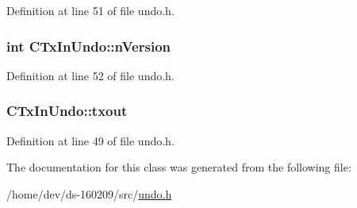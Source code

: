 Definition at line 51 of file undo.\+h.

\hypertarget{class_c_tx_in_undo_a193281289475ca792e436a7a02de23ef}{}
\subsubsection[{n\+Version}]{\setlength{\rightskip}{0pt plus 5cm}int C\+Tx\+In\+Undo\+::n\+Version}\label{class_c_tx_in_undo_a193281289475ca792e436a7a02de23ef}


Definition at line 52 of file undo.\+h.

\hypertarget{class_c_tx_in_undo_a0eb1374984b5b68b0af14d88d7d4b821}{}
\subsubsection[{txout}]{ C\+Tx\+In\+Undo\+::txout}\label{class_c_tx_in_undo_a0eb1374984b5b68b0af14d88d7d4b821}


Definition at line 49 of file undo.\+h.



The documentation for this class was generated from the following file\+:\begin{DoxyCompactItemize}
\item 
/home/dev/ds-\/160209/src/\hyperlink{undo_8h}{undo.\+h}\end{DoxyCompactItemize}
